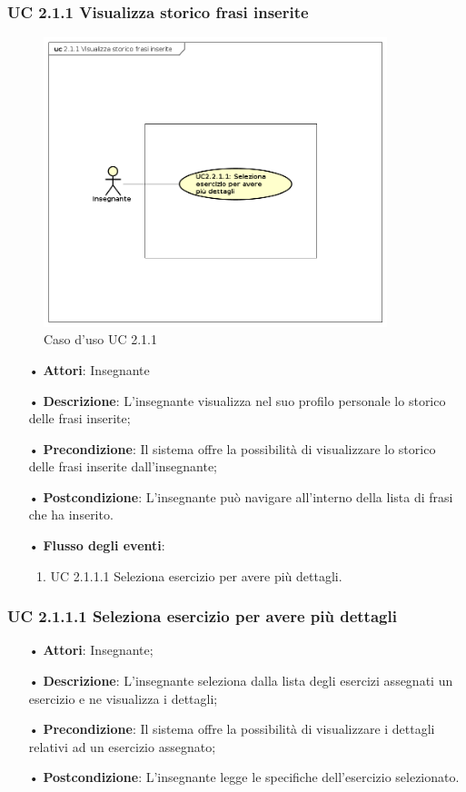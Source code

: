 \subsubsection{UC 2.1.1  Visualizza storico frasi inserite}

\begin{figure}[H]
\centering
\includegraphics[width=10cm]{img/UC211.png} 
\caption{Caso d'uso UC 2.1.1}
\end{figure}

\begin{itemize}
	\item[•] \textbf{Attori}:  Insegnante	   \item[•] \textbf{Descrizione}: L’insegnante visualizza nel suo profilo personale lo storico delle frasi inserite; 
	\item[•] \textbf{Precondizione}: Il sistema offre la possibilità di visualizzare lo storico delle frasi inserite dall’insegnante;
	\item[•] \textbf{Postcondizione}:  L’insegnante può navigare all’interno della lista di frasi che ha inserito.
	\item[•] \textbf{Flusso degli eventi}:
		\begin{enumerate}
			\item UC 2.1.1.1  Seleziona esercizio per avere più dettagli.
		\end{enumerate}
\end{itemize}

\subsubsection{UC 2.1.1.1 Seleziona esercizio per avere più dettagli}
\begin{itemize}
	\item[•] \textbf{Attori}: Insegnante;
	\item[•] \textbf{Descrizione}:  L’insegnante seleziona dalla lista degli esercizi assegnati un esercizio e ne visualizza i dettagli;
	\item[•] \textbf{Precondizione}: Il sistema offre la possibilità di visualizzare i dettagli relativi ad un esercizio assegnato;
	\item[•] \textbf{Postcondizione}: L’insegnante legge le specifiche dell’esercizio selezionato.
\end{itemize}

